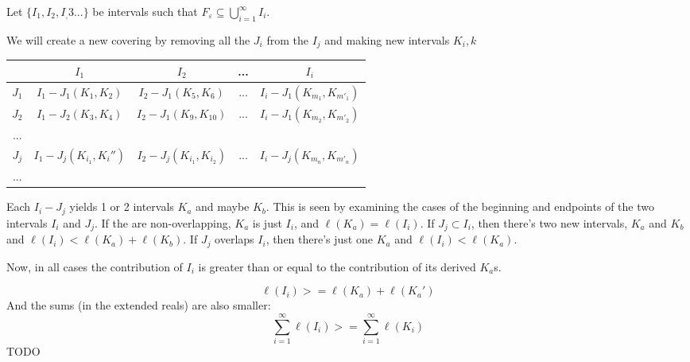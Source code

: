 \documentclass[11pt,oneside]{article}
\numberwithin{equation}{section}
\theoremstyle{definition}
\begin{document}
\begin{solution}
\begin{enumerate}[(a)]
      Let $ \{ I_1, I_2, I_,3 ... \}$ be intervals such that
      $ F _ \varepsilon  \subseteq \bigcup \limits _ {i=1} ^ \infty I_i$.

      We will create a new covering by removing all the $J_i$ from the
      $I_j$ and making new intervals $K_i,k$

      \begin{tabular}{ |c|c|c|c|c|}
        \hline
        \   & $I_1$   & $I_2$ & ... & $I_i$ \\
        \hline
        $J_1$ & $I_1 - J_1 (K_1, K_2)$ & $I_2 - J_1 (K_5, K_6)$ & ... & $I_i - J_1 (K_{m_1}, K_{m'_1})$ \\
        $J_2$ & $I_1 - J_2 (K_3, K_4)$ & $I_2 - J_1 (K_9, K_{10})$ & ... & $I_i - J_1 (K_{m_2}, K_{m'_2})$ \\
        ... &       &   &  &  \\
        $J_j$ & $I_1 - J_j (K_{i_1}, K_i'')$ & $I_2 - J_j (K_{i_1}, K_{i_2})$ & ... & $ I_i - J_j (K_{m_n}, K_{m'_n})$ \\
        ... &       &   &  &  \\
        \hline
      \end{tabular}
      Each $I_i - J_j$ yields 1 or 2 intervals $K_a$ and maybe $K_b$.
      This is seen by examining the cases of the beginning and
      endpoints of the two intervals $I_i$ and $J_j$.  If the are
      non-overlapping, $K_a$ is just $I_i$, and $ \ell(K_a) =
      \ell(I_i)$.  If $J_j \subset I_i$, then there's two new
      intervals, $K_a$ and $K_b$ and $\ell (I_i) < \ell (K_a) + \ell
      (K_b)$.  If $J_j$ overlaps $I_i$, then there's just one $K_a$ and
      $ \ell (I_i) < \ell (K_a)$.

      Now, in all cases the contribution of $I_i$ is greater than or
      equal to the contribution of its derived $K_a$s.  

      $$ \ell(I_i) >= \ell(K_a) + \ell(K_a')
      $$
      And the sums (in the extended reals) are also smaller:
      $$
      \sum \limits _ {i=1} ^ \infty \ell(I_i) >= \sum \limits _ { i = 1} ^ \infty \ell(K_i )
      $$
      TODO
      
  \end{enumerate}
\end{solution}
\end{document}
